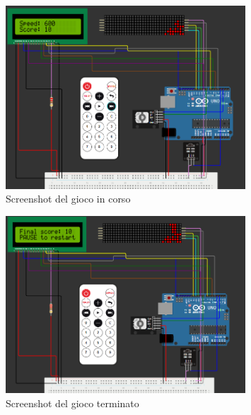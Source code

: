\documentclass[a4paper, 12pt]{article}
\begin{document}
\begin{figure}[H]
    \centering
    \includegraphics[width=0.8\textwidth]{media/in_gioco.png}
    \caption{Screenshot del gioco in corso}
    \label{fig:in_gioco}
\end{figure}


\begin{figure}[H]
    \centering
    \includegraphics[width=0.8\textwidth]{media/fine_gioco.png}
    \caption{Screenshot del gioco terminato}
    \label{fig:fine_gioco}
\end{figure}
\end{document}
